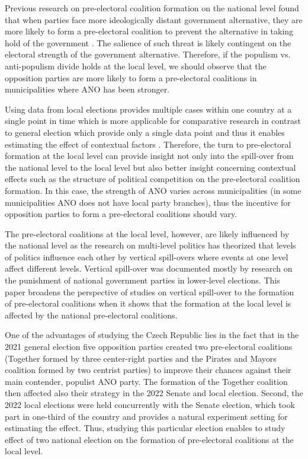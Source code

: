 \documentclass[]{interact}
\theoremstyle{plain}%
\theoremstyle{definition}
\theoremstyle{remark}
\begin{document}
Previous research on pre-electoral coalition formation on the national level found that when parties face more ideologically distant government alternative, they are more likely to form a pre-electoral coalition to prevent the alternative in taking hold of the government \citep{golder2006}. The salience of such threat is likely contingent on the electoral strength of the government alternative. Therefore, if the populism vs. anti-populism divide holds at the local level, we should observe that the opposition parties are more likely to form a pre-electoral coalitions in municipalities where ANO has been stronger. 

Using data from local elections provides multiple cases within one country at a single point in time which is more applicable for comparative research in contrast to general election which provide only a single data point and thus it enables estimating the effect of contextual factors \citep[77]{back2008}. Therefore, the turn to pre-electoral formation at the local level can provide insight not only into the spill-over from the national level to the local level but also better insight concerning contextual effects such as the structure of political competition on the pre-electoral coalition formation. In this case, the strength of ANO varies across municipalities (in some municipalities ANO does not have local party branches), thus the incentive for opposition parties to form a pre-electoral coalitions should vary.

The pre-electoral coalitions at the local level, however, are likely influenced by the national level as the research on multi-level politics has theorized that levels of politics influence each other by vertical spill-overs where events at one level affect different levels. Vertical spill-over was documented mostly by research on the punishment of national government parties in lower-level elections. This paper broadens the perspective of studies on vertical spill-over to the formation of pre-electoral coalitions when it shows that the formation at the local level is affected by the national pre-electoral coalitions. 

One of the advantages of studying the Czech Republic lies in the fact that in the 2021 general election five opposition parties created two pre-electoral coalitions (Together formed by three center-right parties and the Pirates and Mayors coalition formed by two centrist parties) to improve their chances against their main contender, populist ANO party. The formation of the Together coalition then affected also their strategy in the 2022 Senate and local election. Second, the 2022 local elections were held concurrently with the Senate election, which took part in one-third of the country and provides a natural experiment setting for estimating the effect. Thus, studying this particular election enables to study effect of two national election on the formation of pre-electoral coalitions at the local level.
\end{document}
